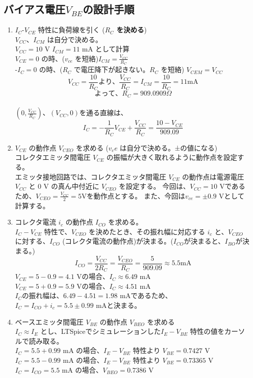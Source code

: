 \subsection{バイアス電圧$V_{BE}$の設計手順}
\begin{enumerate}
  \setlength{\parskip}{0cm} %
  \setlength{\itemsep}{0cm} %
  \item $I_C$-$V_{CE}$ 特性に負荷線を引く (\textbf{$R_C$ を決める})\\
  $V_{CC}$、$I_{CM}$ は自分で決める。\\
  $V_{CC} = 10$ V $I_{CM} = 11$ mA として計算\\
  $V_{CE} = 0$ の時、($v_{ce}$ を短絡)$I_{CM} = \frac{V_{CC}}{R_C}$\\
  -$I_C = 0$ の時、($R_C$ で電圧降下が起きない。$R_C$ を短絡) $V_{CEM} = V_{CC}$\\
  $$V_{CC} = \frac{10}{R_C}  より、 \frac{V_{CC}}{R_C} = I_{CM} = \frac{10}{R_C} = 11 \textrm{mA}$$
  $$よって、R_C = 909.0909 \Omega$$\\
  $(0, \frac{V_{CC}}{R_C})$、$(V_{CC}, 0)$を通る直線は、
  $$I_C = - \frac{1}{R_C} V_{CE} + \frac{V_{CC}}{R_C} = \frac{10 - V_{CE}}{909.09}$$
  \item $V_{CE}$ の動作点 $V_{CEO}$ を求める ($v_ce$ は自分で決める。±の値になる)\\
  コレクタエミッタ間電圧 $V_{CE}$ の振幅が大きく取れるように動作点を設定する。\\
  エミッタ接地回路では、コレクタエミッタ間電圧 $V_{CE}$ の動作点は電源電圧 $V_{CC}$ と 0 V
  の真ん中付近に $V_{CEO}$ を設定する。
  今回は、$V_{CC} = 10$ Vであるため、$V_{CEO} = \frac{V_{CC}}{2} = 5\textrm{V}$を動作点とする。
  また、今回は$v_{ce} = \pm 0.9$ Vとして計算する。
  \item コレクタ電流 $i_c$ の動作点 $I_{CO}$ を求める。\\
  $I_C-V_{CE}$ 特性で、$V_{CEO}$ を決めたとき、その振れ幅に対応する $i_c$ と、$V_{CEO}$ に対する、$I_{CO}$ (コレクタ電流の動作点)が決まる。($I_{CO}$が決まると、$I_{BO}$が決まる。)
  $$I_{CO} = \frac{V_{CC}}{2R_C} = \frac{V_{CEO}}{R_C} = \frac{5}{909.09} \approx 5.5 \textrm{mA}$$
  $V_{CE} = 5 - 0.9 = 4.1$ Vの場合、$I_C \approx 6.49$ mA\\
  $V_{CE} = 5 +0.9 = 5.9$ Vの場合、$I_C \approx 4.51$ mA\\
  $I_C$の振れ幅は、$6.49 - 4.51 = 1.98$ mAであるため、
  $I_C = I_{CO}+i_c = 5.5 \pm 0.99$ mAと決まる。
  \item ベースエミッタ間電圧 $V_{BE}$ の動作点 $V_{BEO}$ を求める\\
  $I_C \approx I_E$ とし、LTSpiceでシミュレーションした$I_E-V_{BE}$ 特性の値をカーソルで読み取る。\\
  $I_C = 5.5 + 0.99$ mA の場合、$I_E-V_{BE}$ 特性より $V_{BE} = 0.7427$ V\\
  $I_C = 5.5 - 0.99$ mA の場合、$I_E-V_{BE}$ 特性より $V_{BE} = 0.73365$ V\\
  $I_C = I_{CO} = 5.5$ mA の場合、$V_{BEO} = 0.7386$ V
\end{enumerate}

